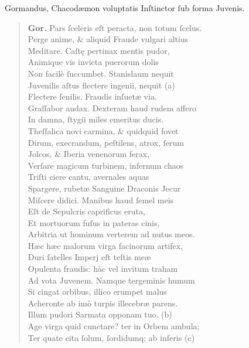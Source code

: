 \documentclass[a4paper,12pt]{article}
\begin{document}
Gormandus, Chacodæmon voluptatis Inſtinctor ſub forma Juvenis.
\begin{verse}
\textbf{Gor.} Pars ſceleris eſt peracta, non totum ſcelus.\\[0pt]
Perge anime, \& aliquid Fraude vulgari altius\\[0pt]
Meditare. Caſtę pertinax mentis pudor,\\[0pt]
Animique vis invicta puerorum dolis\\[0pt]
Non facilè ſuccumbet. Stanislaum nequit\\[0pt]
Juvenilis aſtus flectere ingenii, nequit (a)\footnotemark\\[0pt]
Flectere ſenilis. Fraudis inſuetæ via.\\[0pt]
Graſſabor audax. Dexteram haud rudem affero\\[0pt]
In damna, ſtygii miles emeritus ducis.\\[0pt]
Theſſalica novi carmina, \& quidquid fovet\\[0pt]
Dirum, execrandum, peſtilens, atrox, ſerum\\[0pt]
Jolcos, \& Iberia venenorum ferax,\\[0pt]
Verſare magicum turbinem, infernum chaos\\[0pt]
Triſti ciere cantu, avernales aquas\\[0pt]
Spargere, rubetæ Sanguine Draconis Jecur\\[0pt]
Miſcere didici. Manibus haud ſemel meis\\[0pt]
Eſt de Sepulcris caprificus eruta,\\[0pt]
Et mortuorum fuſus in pateras cinis,\\[0pt]
Arbitria ut hominum verterem ad nutus meos.\\[0pt]
Hæc hæc malorum virga facinorum artifex,\\[0pt]
Duri ſatelles Imperj eſt teſtis meæ\\[0pt]
Opulenta fraudis: hàc vel invitum traham\\[0pt]
Ad vota Juvenem. Namque tergeminis humum\\[0pt]
Si cingat orbibus, illico erumpet malus\\[0pt]
Acheronte ab imò turpis illecebræ parens.\\[0pt]
Illum pudori Sarmata opponam tuo. (b)\footnotemark\\[0pt]
Age virga quid cunctare? ter in Orbem ambula;\\[0pt]
Ter quate cita ſolum, ſordidumq; ab inferis (c)\footnotemark\\[0pt]

\end{verse}
\end{document}

